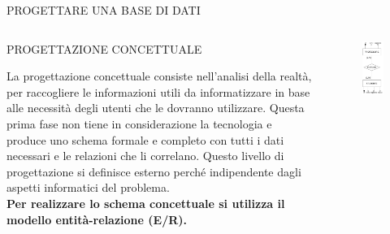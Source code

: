 \documentclass[aspectratio=1610]{beamer}
\begin{document}
\begin{frame}{PROGETTARE UNA BASE DI DATI}
    \begin{columns}
            \begin{alertblock}{PROGETTAZIONE CONCETTUALE}
                \begin{minipage}{0.98\linewidth}
                    \justifying
                    La progettazione concettuale consiste nell’analisi della realtà, per raccogliere
                    le informazioni utili da informatizzare in base alle necessità degli utenti che le
                    dovranno utilizzare. Questa prima fase non tiene in considerazione la
                    tecnologia e produce uno schema formale e completo con tutti i dati necessari
                    e le relazioni che li correlano. Questo livello di progettazione si definisce
                    esterno perché indipendente dagli aspetti informatici del problema.\\
                    \textbf{Per realizzare lo schema concettuale si utilizza il modello entità-relazione (E/R).}
                \end{minipage}
            \end{alertblock}
            \begin{figure}
                \includegraphics[width=.6\linewidth]{img/esempioER.png}

\end{figure}
\end{columns}
\end{frame}
\end{document}
